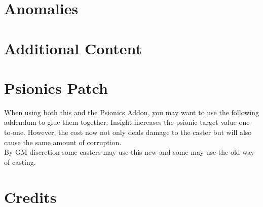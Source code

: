 \documentclass[12pt,a4paper,openany]{book}
\begin{document}
	\chapter{Anomalies}
	
	
	\chapter{Additional Content}
	
	
	\chapter{Psionics Patch}
	When using both this and the Psionics Addon, you may want to use the following addendum to glue them together: 
	Insight increases the psionic target value one-to-one. However, the cost now not only deals damage to the caster but will also cause the same amount of corruption.\\
	By GM discretion some casters may use this new and some may use the old way of casting.
	
	\chapter{Credits}
	
\end{document}
